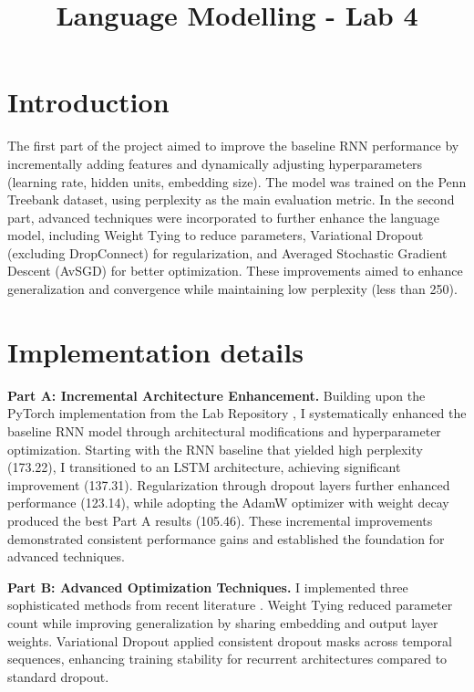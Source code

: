 \documentclass[a4paper]{article}
\title{Language Modelling - Lab 4}
\begin{document}
\maketitle

\section{Introduction}
The first part of the project aimed to improve the baseline RNN performance by incrementally adding 
features and dynamically adjusting hyperparameters (learning rate, hidden units,
embedding size). The model was trained on the Penn Treebank dataset, using perplexity
as the main evaluation metric. In the second part, advanced techniques \cite{merityRegOpt} were 
incorporated to further enhance the language model, including Weight Tying 
to reduce parameters, Variational Dropout (excluding DropConnect) for 
regularization, and Averaged Stochastic Gradient Descent (AvSGD) for better
optimization. These improvements aimed to enhance generalization and 
convergence while maintaining low perplexity (less than 250). 

\section{Implementation details}

\textbf{Part A: Incremental Architecture Enhancement.} Building upon the PyTorch implementation from the Lab Repository \cite{nlu-labs-unitn}, I systematically enhanced the baseline RNN model through architectural modifications and hyperparameter optimization. Starting with the RNN baseline that yielded high perplexity (173.22), I transitioned to an LSTM architecture, achieving significant improvement (137.31). Regularization through dropout layers further enhanced performance (123.14), while adopting the AdamW optimizer with weight decay produced the best Part A results (105.46). These incremental improvements demonstrated consistent performance gains and established the foundation for advanced techniques.

\textbf{Part B: Advanced Optimization Techniques.} I implemented three sophisticated methods from recent literature \cite{merityRegOpt}. Weight Tying reduced parameter count while improving generalization by sharing embedding and output layer weights. Variational Dropout \cite{gal2016theoreticallygroundedapplicationdropout} applied consistent dropout masks across temporal sequences, enhancing training stability for recurrent architectures compared to standard dropout.
\end{document}
